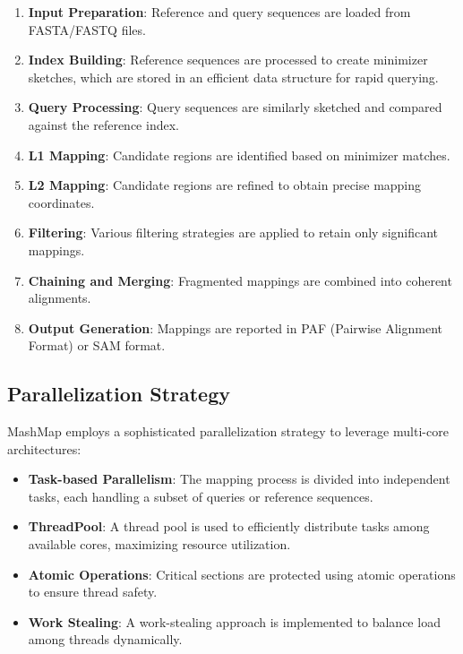 \documentclass{article}
\begin{document}
\begin{enumerate}
    \item \textbf{Input Preparation}: Reference and query sequences are loaded from FASTA/FASTQ files.
    
    \item \textbf{Index Building}: Reference sequences are processed to create minimizer sketches, which are stored in an efficient data structure for rapid querying.
    
    \item \textbf{Query Processing}: Query sequences are similarly sketched and compared against the reference index.
    
    \item \textbf{L1 Mapping}: Candidate regions are identified based on minimizer matches.
    
    \item \textbf{L2 Mapping}: Candidate regions are refined to obtain precise mapping coordinates.
    
    \item \textbf{Filtering}: Various filtering strategies are applied to retain only significant mappings.
    
    \item \textbf{Chaining and Merging}: Fragmented mappings are combined into coherent alignments.
    
    \item \textbf{Output Generation}: Mappings are reported in PAF (Pairwise Alignment Format) or SAM format.
\end{enumerate}

\subsection{Parallelization Strategy}

MashMap employs a sophisticated parallelization strategy to leverage multi-core architectures:

\begin{itemize}
    \item \textbf{Task-based Parallelism}: The mapping process is divided into independent tasks, each handling a subset of queries or reference sequences.
    
    \item \textbf{ThreadPool}: A thread pool is used to efficiently distribute tasks among available cores, maximizing resource utilization.
    
    \item \textbf{Atomic Operations}: Critical sections are protected using atomic operations to ensure thread safety.
    
    \item \textbf{Work Stealing}: A work-stealing approach is implemented to balance load among threads dynamically.
\end{itemize}
\end{document}
